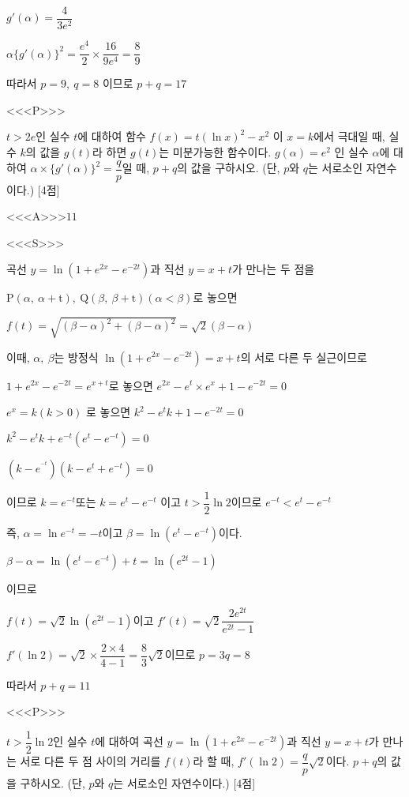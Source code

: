 \documentclass{oblivoir}
\begin{document}
$g'(\alpha)=\dfrac{4}{3e^{2}}$

$\alpha\{g'(\alpha)\}^{2}=\dfrac{e^{4}}{2}\times\dfrac{16}{9e^{4}}=\dfrac{8}{9}$

따라서 $p=9,\:q=8$ 이므로 $p+q=17$

<<<P>>>

$t >2e$인 실수 $t$에 대하여 함수 $f(x)=t(\ln x)^{2}-x^{2}$ 이 $x=k$에서 극대일 때, 실수 $k$의 값을 $g(t)$라 하면 $g(t)$는 미분가능한 함수이다. $g(\alpha)=e^{2}$ 인 실수 $\alpha$에 대하여  $\alpha\times\{g'(\alpha)\}^{2}=\dfrac{q}{p}$일 때, $p+q$의 값을 구하시오. (단, $p$와 $q$는 서로소인 자연수이다.) [4점]

<<<A>>>$11$

<<<S>>>

곡선 $y=\ln(1+e^{2x}-e^{-2t})$과 직선 $y=x+t$가 만나는 두 점을 

$\mathrm{P}(\alpha ,\:\alpha +\mathrm{t}),\:\mathrm{Q}(\beta ,\:\beta +\mathrm{t})(\alpha < \beta)$로 놓으면

$f(t)=\sqrt{(\beta -\alpha)^{2}+(\beta -\alpha)^{2}}=\sqrt{2}(\beta -\alpha)$

이때, $\alpha ,\:\beta$는 방정식 $\ln(1+e^{2x}-e^{-2t})=x+t$의 서로 다른 두 실근이므로

$1+e^{2x}-e^{-2t}=e^{x+t}$로 놓으면 $e^{2x}-e^{t}\times e^{x}+1-e^{-2t}=0$

$e^{x}=k(k>0)$ 로 놓으면 $k^{2}-e^{t}k +1-e^{-2t}=0$

$k^{2}-e^{t}k+e^{-t}\left(e^{t}-e^{-t}\right)=0$

$\left(k-e^{^{-t}}\right)\left(k-e^{t}+e^{-t}\right)=0$

이므로 $k=e^{-t}$또는 $k =e^{t}-e^{-t}$ 이고 $t >\dfrac{1}{2}\ln 2$이므로 $e^{-t}< e^{t}-e^{-t}$

즉, $\alpha =\ln e^{-t}=-t$이고 $\beta =\ln\left(e^{t}-e^{-t}\right)$이다.

$\beta -\alpha =\ln\left(e^{t}-e^{-t}\right)+t =\ln\left(e^{2t}-1\right)$

이므로

$f(t)=\sqrt{2}\ln\left(e^{2t}-1\right)$이고 $f'(t)=\sqrt{2}\dfrac{2e^{2t}}{e^{2t}-1}$

$f'(\ln 2)=\sqrt{2}\times\dfrac{2\times 4}{4-1}=\dfrac{8}{3}\sqrt{2}$이므로 $p=3q=8$

따라서 $p+q=11$

<<<P>>>

$t >\dfrac{1}{2}\ln 2$인 실수 $t$에 대하여 곡선 $y=\ln(1+e^{2x}-e^{-2t})$과 직선 $y=x+t$가 만나는 서로 다른 두 점 사이의 거리를 $f(t)$라 할 때, $f'(\ln 2)=\dfrac{q}{p}\sqrt{2}$이다. $p+q$의 값을 구하시오. (단, $p$와 $q$는 서로소인 자연수이다.) [4점]
\end{document}
